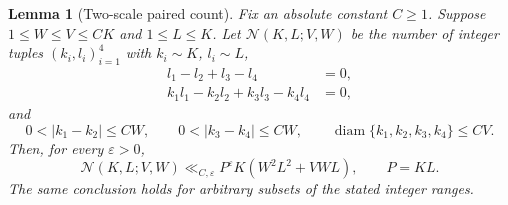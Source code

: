 \documentclass[11pt,reqno]{amsart}
\numberwithin{equation}{section}
\newtheorem{lemma}[lemma]{Lemma}
\theoremstyle{definition}
\theoremstyle{remark}
\newcommand{\eps}{\varepsilon}
\newcommand{\diam}{\operatorname{diam}}
\newcommand{\paircount}{\mathcal N(K,L;V,W)}
\begin{document}
\begin{lemma}[Two-scale paired count]\label{lem:paired}
Fix an absolute constant $C\ge1$. Suppose $1\le W\le V\le CK$ and $1\le L\le K$.
Let $\paircount$ be the number of integer tuples $(k_i,l_i)_{i=1}^4$ with $k_i\sim K$, $l_i\sim L$,
\begin{align}
 l_1-l_2+l_3-l_4&=0,\label{eq:integer1}\\
 k_1l_1-k_2l_2+k_3l_3-k_4l_4&=0,\label{eq:integer2}
\end{align}
and
\begin{equation}\label{eq:pairrestrictions}
 0<|k_1-k_2|\le CW,\qquad
 0<|k_3-k_4|\le CW,\qquad
 \diam\{k_1,k_2,k_3,k_4\}\le CV.
\end{equation}
Then, for every $\eps>0$,
\begin{equation}\label{eq:paircount}
 \paircount\ll_{C,\eps}P^\eps K(W^2L^2+VWL),\qquad P=KL.
\end{equation}
The same conclusion holds for arbitrary subsets of the stated integer ranges.
\end{lemma}
\end{document}
